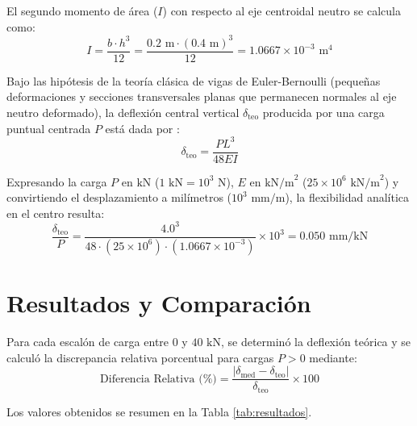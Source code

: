 \documentclass[11pt,letterpaper]{article}
\begin{document}
El segundo momento de área ($I$) con respecto al eje centroidal neutro se calcula como:
\begin{equation}
    I = \frac{b \cdot h^3}{12} = \frac{0.2\text{ m} \cdot (0.4\text{ m})^3}{12} = 1.0667 \times 10^{-3}\text{ m}^4
\end{equation}

Bajo las hipótesis de la teoría clásica de vigas de Euler-Bernoulli (pequeñas deformaciones y secciones transversales planas que permanecen normales al eje neutro deformado), la deflexión central vertical $\delta_{\text{teo}}$ producida por una carga puntual centrada $P$ está dada por \cite{hibbeler_mecanica_2017}:
\begin{equation}
    \delta_{\text{teo}} = \frac{P L^3}{48 E I}
\end{equation}

Expresando la carga $P$ en $\text{kN}$ ($1\text{ kN} = 10^3\text{ N}$), $E$ en $\text{kN/m}^2$ ($25 \times 10^6\text{ kN/m}^2$) y convirtiendo el desplazamiento a milímetros ($10^3\text{ mm/m}$), la flexibilidad analítica en el centro resulta:
\begin{equation}
    \frac{\delta_{\text{teo}}}{P} = \frac{4.0^3}{48 \cdot (25 \times 10^6) \cdot (1.0667 \times 10^{-3})} \times 10^3 = 0.050\text{ mm/kN}
\end{equation}

\section{Resultados y Comparación}
Para cada escalón de carga entre $0$ y $40\text{ kN}$, se determinó la deflexión teórica y se calculó la discrepancia relativa porcentual para cargas $P > 0$ mediante:
\begin{equation}
    \text{Diferencia Relativa (\%)} = \frac{|\delta_{\text{med}} - \delta_{\text{teo}}|}{\delta_{\text{teo}}} \times 100
\end{equation}

Los valores obtenidos se resumen en la Tabla \ref{tab:resultados}.
\end{document}
